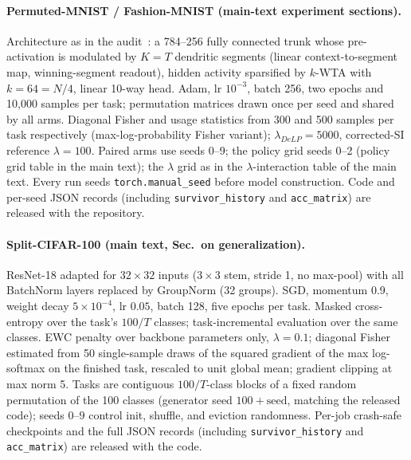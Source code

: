 \documentclass[11pt]{article}
\newcommand{\delp}{DeLP}
\begin{document}
\paragraph{Permuted-MNIST / Fashion-MNIST (main-text experiment
sections).}
Architecture as in the audit~\cite{zhou2026delp}: a 784--256 fully
connected trunk whose pre-activation is modulated by $K{=}T$ dendritic
segments (linear context-to-segment map, winning-segment readout),
hidden activity sparsified by $k$-WTA with $k{=}64 = N/4$, linear
10-way head. Adam, lr $10^{-3}$, batch 256, two epochs and 10{,}000
samples per task; permutation matrices drawn once per seed and shared
by all arms. Diagonal Fisher and usage statistics from 300 and 500
samples per task respectively (max-log-probability Fisher variant);
$\lambda_{\delp}{=}5000$, corrected-SI reference $\lambda{=}100$.
Paired arms use seeds 0--9; the policy grid seeds 0--2 (policy grid
table in the main text); the $\lambda$ grid as in the $\lambda$-interaction
table of the main text. Every run seeds
\texttt{torch.manual\_seed} before model construction. Code and
per-seed JSON records (including \texttt{survivor\_history} and
\texttt{acc\_matrix}) are released with the repository.

\begin{sloppypar}
\paragraph{Split-CIFAR-100 (main text, Sec.~on generalization).}
ResNet-18 adapted for $32{\times}32$ inputs ($3{\times}3$ stem,
stride 1, no max-pool) with all BatchNorm layers replaced by GroupNorm
(32 groups). SGD, momentum 0.9, weight decay $5{\times}10^{-4}$, lr
$0.05$, batch 128, five epochs per task. Masked cross-entropy over the
task's $100/T$ classes; task-incremental evaluation over the same classes.
EWC penalty over backbone parameters only, $\lambda{=}0.1$; diagonal
Fisher estimated from 50 single-sample draws of the squared gradient
of the max log-softmax on the finished task, rescaled to unit global
mean; gradient clipping at max norm 5. Tasks are contiguous
$100/T$-class blocks of a fixed random permutation of the 100 classes
(generator seed $100{+}\mathrm{seed}$, matching the released code);
seeds $0$--$9$ control init,
shuffle, and eviction randomness. Per-job crash-safe checkpoints and
the full JSON records (including \texttt{survivor\_history} and
\texttt{acc\_matrix}) are released with the code.
\end{sloppypar}
\end{document}
